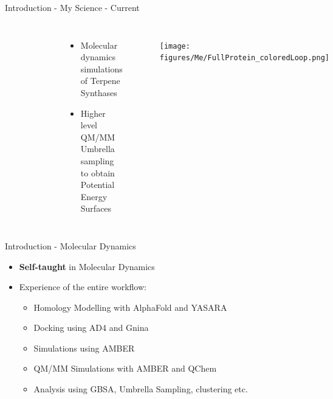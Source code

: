 \begin{frame}{Introduction - My Science - Current}
\begin{columns}
\begin{figure}
\includegraphics[width=0.4\textwidth]{figures/Me/Wham_Hist}
\end{figure}
\begin{itemize}
	\item Molecular dynamics simulations of Terpene Synthases
	\item Higher level QM/MM Umbrella sampling to obtain Potential Energy Surfaces
\end{itemize}

\begin{figure}
\texttt{[image: figures/Me/FullProtein\_coloredLoop.png]}
\end{figure}
\end{columns}
\end{frame}

\begin{frame}{Introduction - Molecular Dynamics}
\begin{itemize}
\item \textbf{Self-taught} in Molecular Dynamics

\item Experience of the entire workflow:
	\begin{itemize}
		\item Homology Modelling with AlphaFold and YASARA
		\item Docking using AD4 and Gnina
		\item Simulations using AMBER
		\item QM/MM Simulations with AMBER and QChem
		\item Analysis using GBSA, Umbrella Sampling, clustering etc.
	\end{itemize}
\end{itemize}
\end{frame}
